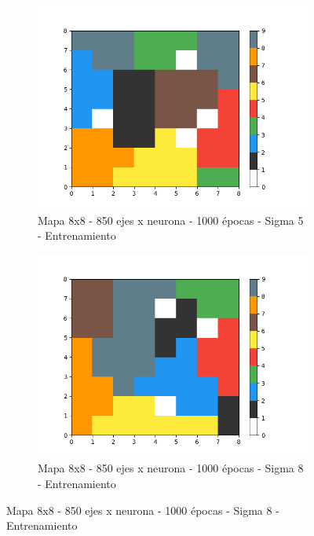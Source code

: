 \begin{figure}[!htbp]
\centering
\begin{subfigure}{.5\textwidth}
  \centering
  \includegraphics[width=1\linewidth, scale=1]{../img/map8x8_1000ep_850en.png}
  \caption{Mapa 8x8 - 850 ejes x neurona - 1000 épocas - Sigma 5 - Entrenamiento}
  \label{fig:sub1}
\end{subfigure}%
\begin{subfigure}{.5\textwidth}
  \centering
  \includegraphics[width=1\linewidth, scale=1]{../img/map8x8_1000ep_850en_sigma8.png}
  \caption{Mapa 8x8 - 850 ejes x neurona - 1000 épocas - Sigma 8 - Entrenamiento}
  \label{fig:sub2}
\end{subfigure}
\end{figure}


